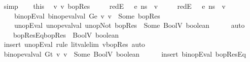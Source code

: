 \begin{isabellebody}
\ simp\isanewline
\ \ \isamarkupfalse%
\ this\ \isamarkupfalse%
\ v{}\ v{}\ bopRes\ \isanewline
\ \ \ \ redE{}{\isacharcolon}{\kern0pt}\ {\isachardoublequoteopen}{\isasymLambda}{\isacharcomma}{\kern0pt}{\isasymGamma}{\isacharcomma}{\kern0pt}{\isasymOmega}\ {\isasymturnstile}\ {\isasymlangle}e{}{\isacharcomma}{\kern0pt}\ ns{\isasymrangle}\ {\isasymDown}\ v{}{\isachardoublequoteclose}\ \isanewline
\ \ \ \ redE{}{\isacharcolon}{\kern0pt}\ {\isachardoublequoteopen}{\isasymLambda}{\isacharcomma}{\kern0pt}{\isasymGamma}{\isacharcomma}{\kern0pt}{\isasymOmega}\ {\isasymturnstile}\ {\isasymlangle}e{}{\isacharcomma}{\kern0pt}\ ns{\isasymrangle}\ {\isasymDown}\ v{}{\isachardoublequoteclose}\ \isanewline
\ \ \ \ binopEval{\isacharcolon}{\kern0pt}\ {\isachardoublequoteopen}binop{\isacharunderscore}{\kern0pt}eval{\isacharunderscore}{\kern0pt}val\ Ge\ v{}\ v{}\ {\isacharequal}{\kern0pt}\ Some\ bopRes{\isachardoublequoteclose}\ \isanewline
\ \ \ \ unopEval{\isacharcolon}{\kern0pt}\ {\isachardoublequoteopen}unop{\isacharunderscore}{\kern0pt}eval{\isacharunderscore}{\kern0pt}val\ unop{\isachardot}{\kern0pt}Not\ bopRes\ {\isacharequal}{\kern0pt}\ Some\ {\isacharparenleft}{\kern0pt}BoolV\ boolean{\isacharparenright}{\kern0pt}{\isachardoublequoteclose}\isanewline
\ \ \ \ \isamarkupfalse%
\ auto\isanewline
\isanewline
\ \ \isamarkupfalse%
\ bopResEq{\isacharcolon}{\kern0pt}{\isachardoublequoteopen}bopRes\ {\isacharequal}{\kern0pt}\ BoolV\ {\isacharparenleft}{\kern0pt}{\isasymnot}boolean{\isacharparenright}{\kern0pt}{\isachardoublequoteclose}\ \isanewline
\ \ \ \ \isamarkupfalse%
\ {\isacharparenleft}{\kern0pt}insert\ unopEval{\isacharcomma}{\kern0pt}\ rule\ lit{\isacharunderscore}{\kern0pt}val{\isacharunderscore}{\kern0pt}elim{\isacharbrackleft}{\kern0pt}\ v{\isacharequal}{\kern0pt}bopRes{\isacharbrackright}{\kern0pt}{\isacharparenright}{\kern0pt}\ auto\isanewline
\isanewline
\ \ \isamarkupfalse%
\ {\isachardoublequoteopen}binop{\isacharunderscore}{\kern0pt}eval{\isacharunderscore}{\kern0pt}val\ Gt\ v{}\ v{}\ {\isacharequal}{\kern0pt}\ Some\ {\isacharparenleft}{\kern0pt}BoolV\ boolean{\isacharparenright}{\kern0pt}{\isachardoublequoteclose}\isanewline
\ \ \ \ \isamarkupfalse%
\ {\isacharparenleft}{\kern0pt}insert\ binopEval\ bopResEq{\isacharparenright}{\kern0pt}\isanewline

\end{isabellebody}
